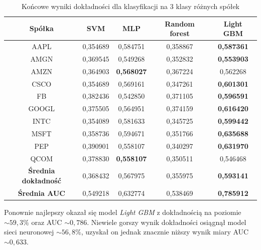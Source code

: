 \documentclass[a4paper, twoside, 11pt, openright]{article}
\begin{document}
\begin{table}[H]
    \centering
    \begin{tabular}{|c|c|c|c|c|}
    \hline
        \textbf{Spółka} & \textbf{SVM} &  \textbf{MLP}  &  \textbf{Random forest}  &  \textbf{Light GBM} \\ \hline
AAPL   &  0,354689 & 0,584751  & 0,358867 & \textbf{0,587361} \\ \hline
AMGN   &  0,369545 &  0,549268 & 0,352832 &  \textbf{0,553903} \\ \hline
AMZN   &  0,364903 & \textbf{0,568027} & 0,367224  & 0,562268 \\ \hline
CSCO   &  0,354689 &  0,569161 & 0,347261 &  \textbf{0,601301} \\ \hline
FB     &  0,382436 & 0,542850 & 0,371105 & \textbf{0,596591} \\ \hline
GOOGL  &  0,375505 &  0,564951 & 0,374159 & \textbf{0,616420} \\ \hline
INTC   &  0,354089 & 0,581633  & 0,345725 & \textbf{0,599442} \\ \hline
MSFT   &  0,358736 &   0,594671 & 0,351766 &  \textbf{0,635688} \\ \hline
PEP    &  0,390901 & 0,558107  & 0,340297 & \textbf{0,631970} \\ \hline
QCOM   &  0,378830 &  \textbf{0,558107} & 0,350511 & 0,546468 \\ \hline \hline
\textbf{Średnia dokładność} &  0,368432 & 0,567975 & 0,355975 & \textbf{0,593141} \\  \hline  
\textbf{Średnia AUC} &  0,549218 & 0,632774 & 0,538469 & \textbf{0,785912} \\  \hline
    \end{tabular}
    \caption{Końcowe wyniki dokładności dla klasyfikacji na 3 klasy różnych spółek}
    \label{tab:comparison_final_discrete}
\end{table}

Ponownie najlepszy okazał się model \textit{Light GBM} z dokładnością na poziomie $\sim 59,3\%$ oraz AUC $\sim 0,786$. Niewiele gorszy wynik dokładności osiągnął model sieci neuronowej $\sim 56,8\%$,  uzyskał on jednak znacznie niższy wynik miary AUC $\sim 0,633$.
\end{document}
